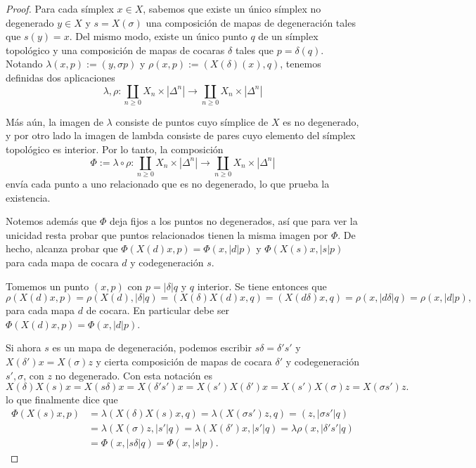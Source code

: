 \documentclass[11pt]{report}
\theoremstyle{colored}
\renewcommand{\ss}[1]{\Delta^{#1}}
\begin{document}
\begin{proof} Para cada símplex $x \in X$, sabemos que existe un único símplex no degenerado $y \in X$ y $s = X(\sigma)$ una composición de mapas de degeneración tales que $s(y) = x$. Del mismo modo, existe un único punto $q$ de un símplex topológico y una composición de mapas de cocaras $\delta$ tales que $p = \delta(q)$. Notando $\lambda(x,p) := (y,\sigma p)$ y $\rho(x,p) := (X(\delta)(x),q)$, tenemos definidas dos aplicaciones
\[
\lambda, \rho : \coprod_{n \geq 0} X_n \times |\ss{n}| \to \coprod_{n \geq 0} X_n \times |\ss{n}|
\] 

Más aún, la imagen de $\lambda$ consiste de puntos cuyo símplice de $X$ es no degenerado, y por otro lado la imagen de lambda consiste de pares cuyo elemento del símplex topológico es interior. Por lo tanto, la composición
\[
\Phi := \lambda \circ \rho : \coprod_{n \geq 0} X_n \times |\ss{n}| \to \coprod_{n \geq 0} X_n \times |\ss{n}|
\]
envía cada punto a uno relacionado que es no degenerado, lo que prueba la existencia.

Notemos además que $\Phi$ deja fijos a los puntos no degenerados, así que para ver la unicidad resta probar que puntos relacionados tienen la misma imagen por $\Phi$. De hecho, alcanza probar que  $\Phi(X(d)x,p) = \Phi(x,|d|p)$ y $\Phi(X(s)x,|s|p)$ para cada mapa de cocara $d$ y codegeneración $s$. 

Tomemos un punto $(x,p)$ con $p = |\delta|q$ y $q$ interior. Se tiene entonces que
\[
\rho(X(d)x,p) = \rho(X(d),|\delta|q) = (X(\delta)X(d)x,q) = (X(d\delta)x,q) = \rho(x,|d\delta|q) = \rho(x,|d|p),
\]
para cada mapa $d$ de cocara. En particular debe ser $\Phi(X(d)x,p) = \Phi(x,|d|p)$. 

Si ahora $s$ es un mapa de degeneración, podemos escribir $s\delta = \delta's'$ y $X(\delta')x = X(\sigma)z$ y cierta composición de mapas de cocara $\delta'$ y codegeneración $s',\sigma$, con $z$ no degenerado. Con esta notación es
\[
X(\delta)X(s)x = X(s\delta)x = X(\delta's')x = X(s')X(\delta')x = X(s')X(\sigma)z = X(\sigma s')z.
\]
lo que finalmente dice que
\begin{align*}
\Phi(X(s)x,p) &= \lambda(X(\delta)X(s)x,q) = \lambda(X(\sigma s')z,q) = (z,|\sigma s'|q)\\
&= \lambda(X(\sigma)z,|s'|q) = \lambda(X(\delta')x,|s'|q) = \lambda\rho(x,|\delta's'|q)\\
&= \Phi(x,|s\delta|q) = \Phi(x,|s|p).
\end{align*}
\end{proof}
\end{document}
